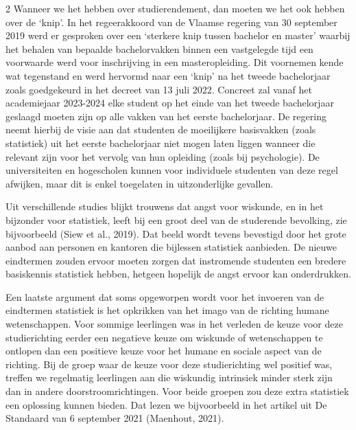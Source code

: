 \begin{multicols}{2}
        Wanneer we het hebben over studierendement, dan moeten we het ook hebben over de `knip'. In het regeerakkoord van de Vlaamse regering van 30 september 2019 werd er gesproken over een `sterkere knip tussen bachelor en master' waarbij het behalen van bepaalde bachelorvakken binnen een vastgelegde tijd een voorwaarde werd voor inschrijving in een masteropleiding. Dit voornemen kende wat tegenstand en werd hervormd naar een `knip' na het tweede bachelorjaar zoals goedgekeurd in het decreet van 13 juli 2022. Concreet zal vanaf het academiejaar 2023-2024 elke student op het einde van het tweede bachelorjaar geslaagd moeten zijn op alle vakken van het eerste bachelorjaar. De regering neemt hierbij de visie aan dat studenten de moeilijkere basisvakken (zoals statistiek) uit het eerste bachelorjaar niet mogen laten liggen wanneer die relevant zijn voor het vervolg van hun opleiding (zoals bij psychologie). De universiteiten en hogescholen kunnen voor individuele studenten van deze regel afwijken, maar dit is enkel toegelaten in uitzonderlijke gevallen. 

        Uit verschillende studies blijkt trouwens dat angst voor wiskunde, en in het bijzonder voor statistiek, leeft bij een groot deel van de studerende bevolking, zie bijvoorbeeld (Siew et al., 2019). Dat beeld wordt tevens bevestigd door het grote aanbod aan personen en kantoren die bijlessen statistiek aanbieden. De nieuwe eindtermen zouden ervoor moeten zorgen dat instromende studenten een bredere basiskennis statistiek hebben, hetgeen hopelijk de angst ervoor kan onderdrukken. 
        
        Een laatste argument dat soms opgeworpen wordt voor het invoeren van de eindtermen statistiek is het opkrikken van het imago van de richting humane wetenschappen. Voor sommige leerlingen was in het verleden de keuze voor deze studierichting eerder een negatieve keuze om wiskunde of wetenschappen te ontlopen dan een positieve keuze voor het humane en sociale aspect van de richting. Bij de groep waar de keuze voor deze studierichting wel positief was, treffen we regelmatig leerlingen aan die wiskundig intrinsiek minder sterk zijn dan in andere doorstroomrichtingen. Voor beide groepen zou deze extra statistiek een oplossing kunnen bieden. Dat lezen we bijvoorbeeld in het artikel uit De Standaard van 6 september 2021 (Maenhout, 2021).
        

\end{multicols}
